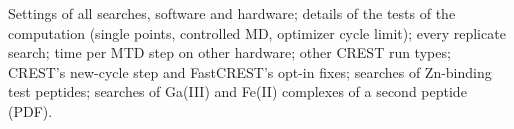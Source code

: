 \documentclass[journal=jctcce,manuscript=article]{achemso}
\begin{document}
\begin{suppinfo}
Settings of all searches, software and hardware; details of the tests of the computation (single points, controlled MD, optimizer cycle limit); every replicate search; time per MTD step on other hardware; other CREST run types; CREST's new-cycle step and FastCREST's opt-in fixes; searches of Zn-binding test peptides; searches of Ga(III) and Fe(II) complexes of a second peptide (PDF).
\end{suppinfo}


\end{document}
